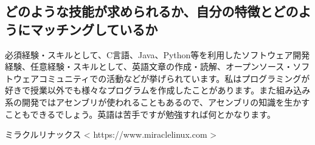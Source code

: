 \documentclass[a4paper]{jsarticle}
\begin{document}
\subsection{どのような技能が求められるか、自分の特徴とどのようにマッチングしているか}
必須経験・スキルとして、C言語、Java、Python等を利用したソフトウェア開発経験、任意経験・スキルとして、英語文章の作成・読解、オープンソース・ソフトウェアコミュニティでの活動などが挙げられています。私はプログラミングが好きで授業以外でも様々なプログラムを作成したことがあります。また組み込み系の開発ではアセンブリが使われることもあるので、アセンブリの知識を生かすこともできるでしょう。英語は苦手ですが勉強すれば何とかなります。
\begin{thebibliography}{1}
	\item ミラクルリナックス
		\textless
		https://www.miraclelinux.com
		\textgreater
\end{thebibliography}
\end{document}
